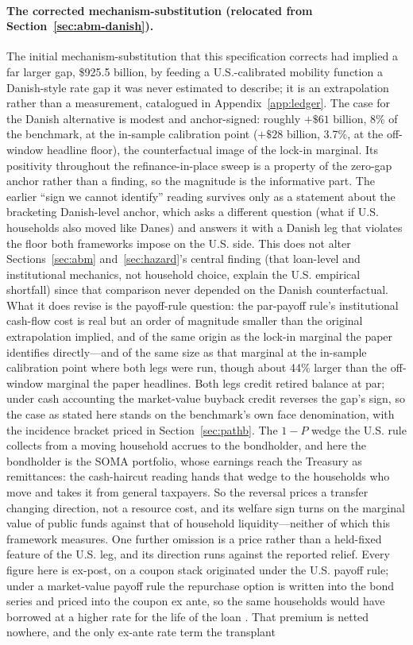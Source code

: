 \documentclass[12pt]{article}
\begin{document}
\paragraph{The corrected mechanism-substitution (relocated from Section~\ref{sec:abm-danish}).}
The initial mechanism-substitution that this specification corrects had implied a far larger gap, \$925.5 billion, by feeding a U.S.-calibrated mobility function a Danish-style rate gap it was never estimated to describe; it is an extrapolation rather than a measurement, catalogued in Appendix~\ref{app:ledger}. The case for the Danish alternative is modest and anchor-signed: roughly $+\$61$ billion, 8\% of the benchmark, at the in-sample calibration point ($+\$28$ billion, 3.7\%, at the off-window headline floor), the counterfactual image of the lock-in marginal. Its positivity throughout the refinance-in-place sweep is a property of the zero-gap anchor rather than a finding, so the magnitude is the informative part. The earlier ``sign we cannot identify'' reading survives only as a statement about the bracketing Danish-level anchor, which asks a different question (what if U.S. households also moved like Danes) and answers it with a Danish leg that violates the floor both frameworks impose on the U.S. side. This does not alter Sections~\ref{sec:abm} and~\ref{sec:hazard}'s central finding (that loan-level and institutional mechanics, not household choice, explain the U.S. empirical shortfall) since that comparison never depended on the Danish counterfactual. What it does revise is the payoff-rule question: the par-payoff rule's institutional cash-flow cost is real but an order of magnitude smaller than the original extrapolation implied, and of the same origin as the lock-in marginal the paper identifies directly---and of the same size as that marginal at the in-sample calibration point where both legs were run, though about 44\% larger than the off-window marginal the paper headlines. Both legs credit retired balance at par; under cash accounting the market-value buyback credit reverses the gap's sign, so the case as stated here stands on the benchmark's own face denomination, with the incidence bracket priced in Section~\ref{sec:pathb}. The $1-P$ wedge the U.S. rule collects from a moving household accrues to the bondholder, and here the bondholder is the SOMA portfolio, whose earnings reach the Treasury as remittances: the cash-haircut reading hands that wedge to the households who move and takes it from general taxpayers. So the reversal prices a transfer changing direction, not a resource cost, and its welfare sign turns on the marginal value of public funds against that of household liquidity---neither of which this framework measures. One further omission is a price rather than a held-fixed feature of the U.S. leg, and its direction runs against the reported relief. Every figure here is ex-post, on a coupon stack originated under the U.S. payoff rule; under a market-value payoff rule the repurchase option is written into the bond series and priced into the coupon ex ante, so the same households would have borrowed at a higher rate for the life of the loan \citep{campbell2013,berg2018}. That premium is netted nowhere, and the only ex-ante rate term the transplant 
\end{document}
